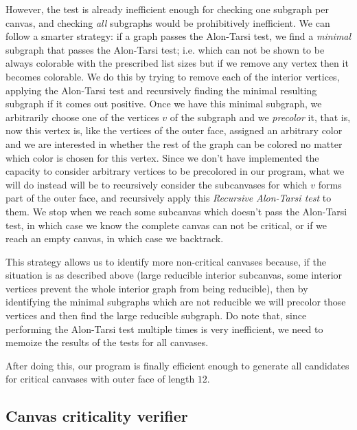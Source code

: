 \documentclass{article}
\begin{document}
However, the test is already inefficient enough for checking one subgraph per canvas, and checking \emph{all} subgraphs would be prohibitively inefficient. We can follow a smarter strategy: if a graph passes the Alon-Tarsi test, we find a \emph{minimal} subgraph that passes the Alon-Tarsi test; i.e. which can not be shown to be always colorable with the prescribed list sizes but if we remove any vertex then it becomes colorable. We do this by trying to remove each of the interior vertices, applying the Alon-Tarsi test and recursively finding the minimal resulting subgraph if it comes out positive. Once we have this minimal subgraph, we arbitrarily choose one of the vertices $v$ of the subgraph and we \textit{precolor} it, that is, now this vertex is, like the vertices of the outer face, assigned an arbitrary color and we are interested in whether the rest of the graph can be colored no matter which color is chosen for this vertex. Since we don't have implemented the capacity to consider arbitrary vertices to be precolored in our program, what we will do instead will be to recursively consider the subcanvases for which $v$ forms part of the outer face, and recursively apply this \textit{Recursive Alon-Tarsi test} to them. We stop when we reach some subcanvas which doesn't pass the Alon-Tarsi test, in which case we know the complete canvas can not be critical, or if we reach an empty canvas, in which case we backtrack.

This strategy allows us to identify more non-critical canvases because, if the situation is as described above (large reducible interior subcanvas, some interior vertices prevent the whole interior graph from being reducible), then by identifying the minimal subgraphs which are not reducible we will precolor those vertices and then find the large reducible subgraph. Do note that, since performing the Alon-Tarsi test multiple times is very inefficient, we need to memoize the results of the tests for all canvases. 

After doing this, our program is finally efficient enough to generate all candidates for critical canvases with outer face of length $12$.

\subsection{Canvas criticality verifier}

\newpage

\printbibliography
\end{document}

